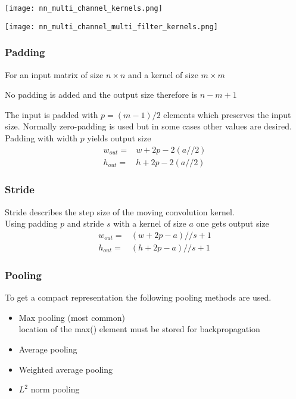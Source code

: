 \newpar{}
\begin{center}
    \texttt{[image: nn\_multi\_channel\_kernels.png]}
\end{center}

\newpar{}
\begin{center}
    \texttt{[image: nn\_multi\_channel\_multi\_filter\_kernels.png]}
\end{center}

\subsubsection{Padding}

For an input matrix of size $n\times n$ and a kernel of size $m\times m$

\newpar{}

No padding is added and the output size therefore is $n-m+1$

\newpar{}

The input is padded with $p=(m-1)/2$ elements which preserves the input size. Normally zero-padding is used but in some cases other values are desired.\\
Padding with width $p$ yields output size
\begin{align*}
    w_{out}= & w+2p-2(a//2) \\
    h_{out}= & h+2p-2(a//2)
\end{align*}

\subsubsection{Stride}
Stride describes the step size of the moving convolution kernel.\\
Using padding $p$ and stride $s$ with a kernel of size $a$ one gets output size
\begin{align*}
    w_{out}= & (w+2p-a)//s + 1 \\
    h_{out}= & (h+2p-a)//s + 1
\end{align*}


\subsubsection{Pooling}
To get a compact representation the following pooling methods are used.
\begin{itemize}
    \item Max pooling (most common)
          \\ location of the max() element must be stored for backpropagation
    \item Average pooling
    \item Weighted average pooling
    \item $L^2$ norm pooling
\end{itemize}

